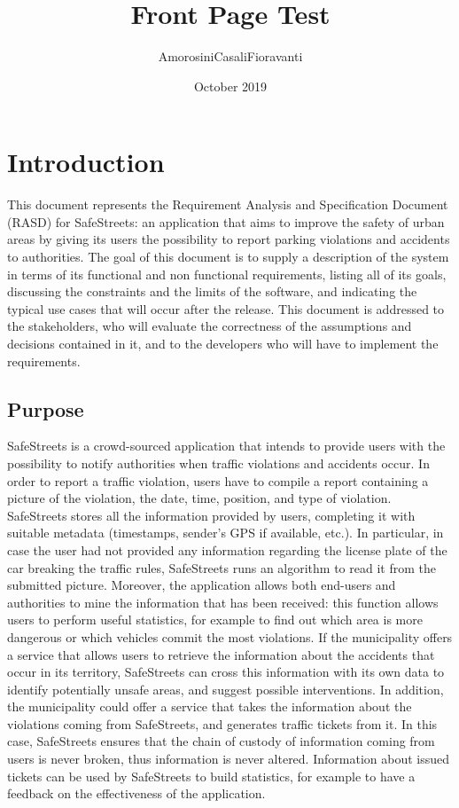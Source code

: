 \documentclass{report}
\title{Front Page Test}
\author{AmorosiniCasaliFioravanti}
\date{October 2019}
\begin{document}
\maketitle 
\tableofcontents
\chapter{Introduction}
This document represents the Requirement Analysis and Specification Document (RASD) for SafeStreets: an application that aims to improve the safety of urban areas by giving its users the possibility to report parking violations and accidents to authorities. The goal of this document is to supply a description of the system in terms of its functional and non functional requirements, listing all of its goals, discussing the constraints and the limits of the software, and indicating the typical use cases that will occur after the release. This document is addressed to the stakeholders, who will evaluate the correctness of the assumptions and decisions contained in it, and to the developers who will have to implement the requirements.
\section{Purpose}
SafeStreets is a crowd-sourced application that intends to provide users with the possibility to notify authorities when traffic violations and accidents occur. In order to report a traffic violation, users have to compile a report containing a picture of the violation, the date, time, position, and type of violation. SafeStreets stores all the information provided by users, completing it with suitable metadata (timestamps, sender's GPS if available, etc.). In particular, in case the user had not provided any information regarding the license plate of the car breaking the traffic rules, SafeStreets runs an algorithm to read it from the submitted picture. Moreover, the application allows both end-users and authorities to mine the information that has been received: this function allows users to perform useful statistics, for example to find out which area is more dangerous or which vehicles commit the most violations. If the municipality offers a service that allows users to retrieve the information about the accidents that occur in its territory, SafeStreets can cross this information with its own data to identify potentially unsafe areas, and suggest possible interventions.
In addition, the municipality could offer a service that takes the information about the violations coming from SafeStreets, and generates traffic tickets from it. In this case, SafeStreets ensures that the chain of custody of information coming from users is never broken, thus information is never altered. Information about issued tickets can be used by SafeStreets to build statistics, for example to have a feedback on the effectiveness of the application.
\end{document}
